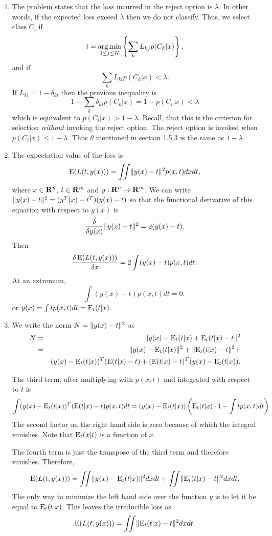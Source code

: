 \begin{enumerate}
\item The problem states that the loss incurred in the reject option is $\lambda$. In other
words, if the expected loss exceed $\lambda$ then we do not classify. Thus, we select class 
$C_i$ if
\[
i = \operatorname*{arg\,min}_{1 \le j \le K}\left\{\sum_k L_{kj}p(C_k|x)\right\},
\]
and if 
\[
\sum_{k} L_{ki}p(C_k|x) < \lambda.
\]
If $L_{ki} = 1 - \delta_{ki}$ then the previous inequality is
\[
1 - \sum_{k}\delta_{ki}p(C_k|x) = 1 - p(C_i|x) < \lambda 
\]
which is equivalent to $p(C_i|x) > 1 - \lambda$. Recall, that this is the criterion for 
selection \emph{without} invoking the reject option. The reject option is invoked when
$p(C_i|x) \le 1 - \lambda$. Thus $\theta$ mentioned in section 1.5.3 is the same as $1 - \lambda$.

\item The expectation value of the loss is
\[
\operatorname{E}(L(t, y(x))) = \iint \lVert y(x) - t\rVert^2p(x, t)dxdt,
\]
where $x \in \mathbf{R}^n$, $t \in \mathbf{R}^m$ and $y:\mathbf{R}^n \to \mathbf{R}^m$. We can write $\lVert y(x) - t\rVert^2 =
(y^T(x) - t^T)(y(x) - t)$ so that the functional derivative of this equation with respect to $y(x)$ is
\[
\frac{\delta}{\delta y(x)}\lVert y(x) - t\rVert^2 = 2(y(x) - t).
\]
Then
\[
\frac{\delta\operatorname{E}(L(t, y(x)))}{\delta x} = 2\int (y(x) - t)p(x,t)dt.
\]
At an extremum,
\[
\int (y(x) - t)p(x, t)dt = 0,
\]
or $y(x) = \int t p(x, t)dt = \operatorname{E}_t(t|x)$.

\item We write the norm $N = \lVert y(x) - t\rVert^2$ as 
\begin{eqnarray*}
N &=& \lVert y(x) - \operatorname{E}_t(t|x) + \operatorname{E}_t(t|x) - t\rVert^2 \\
 &=& \lVert y(x) - \operatorname{E}_t(t|x)\rVert^2 + \lVert\operatorname{E}_t(t|x) - t\rVert^2 + \\
 & & (y(x) - \operatorname{E}_t(t|x))^T(\operatorname{E}(t|x) - t) + (\operatorname{E}(t|x) - t)^T(y(x) - \operatorname{E}_t(t|x)).
\end{eqnarray*}

The third term, after multiplying with $p(x,t)$ and integrated with respect to $t$ is
\[
\int (y(x) - \operatorname{E}_t(t|x))^T(\operatorname{E}(t|x) - t)p(x, t)dt = (y(x) - \operatorname{E}_t(t|x))\left(\operatorname{E}_t(t|x)\cdot 1 - \int t p(x,t)dt\right) 
\]
The second factor on the right hand side is zero because of which the integral vanishes. Note
that $\operatorname{E}_t(x|t)$ is a function of $x$.

The fourth term is just the transpose of the third term and therefore vanishes. Therefore,
\[
\operatorname{E}(L(t, y(x))) = \iint\lVert y(x) - \operatorname{E}_t(t|x)\rVert^2dxdt + \iint\lVert\operatorname{E}_t(t|x) - t\rVert^2dxdt.
\]
The only way to minimize the left hand side over the function $y$ is to let it be equal to $\operatorname{E}_t(t|x)$.
This leaves the irreducible loss as
\[
\operatorname{E}(L(t, y(x))) = \iint\lVert\operatorname{E}_t(t|x) - t\rVert^2dxdt.
\]


\end{enumerate}
